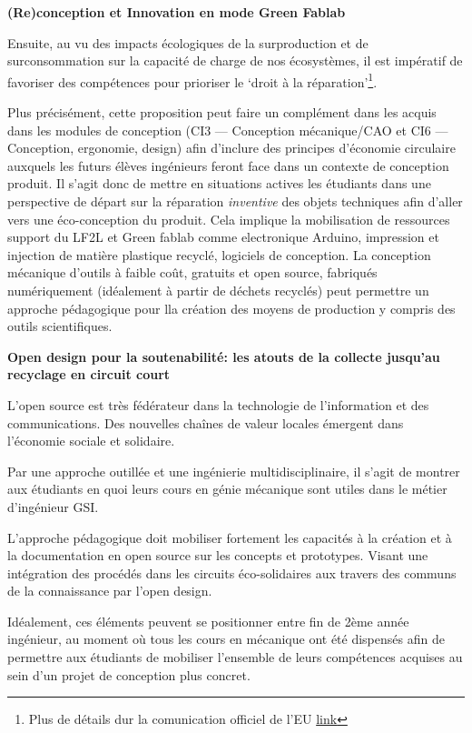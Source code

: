 \documentclass[
  11pt,
]{article}
\begin{document}
\textbf{(Re)conception et Innovation en mode Green Fablab}

Ensuite, au vu des impacts écologiques de la surproduction et de
surconsommation sur la capacité de charge de nos écosystèmes, il est
impératif de favoriser des compétences pour prioriser le `droit à la
réparation'\footnote{Plus de détails dur la comunication officiel de
  l'EU
  \href{https://www.europarl.europa.eu/news/en/headlines/society/20220331STO26410/why-is-the-eu-s-right-to-repair-legislation-important}{link}}.

Plus précisément, cette proposition peut faire un complément dans les
acquis dans les modules de conception (CI3 --- Conception mécanique/CAO
et CI6 --- Conception, ergonomie, design) afin d'inclure des principes
d'économie circulaire auxquels les futurs élèves ingénieurs feront face
dans un contexte de conception produit. Il s'agit donc de mettre en
situations actives les étudiants dans une perspective de départ sur la
réparation \emph{inventive} des objets techniques afin d'aller vers une
éco-conception du produit. Cela implique la mobilisation de ressources
support du LF2L et Green fablab comme electronique Arduino, impression
et injection de matière plastique recyclé, logiciels de conception. La
conception mécanique d'outils à faible coût, gratuits et open source,
fabriqués numériquement (idéalement à partir de déchets recyclés) peut
permettre un approche pédagogique pour lla création des moyens de
production y compris des outils scientifiques.

\textbf{Open design pour la soutenabilité: les atouts de la collecte
jusqu'au recyclage en circuit court}

L'open source est très fédérateur dans la technologie de l'information
et des communications. Des nouvelles chaînes de valeur locales émergent
dans l'économie sociale et solidaire.

Par une approche outillée et une ingénierie multidisciplinaire, il
s'agit de montrer aux étudiants en quoi leurs cours en génie mécanique
sont utiles dans le métier d'ingénieur GSI.

L'approche pédagogique doit mobiliser fortement les capacités à la
création et à la documentation en open source sur les concepts et
prototypes. Visant une intégration des procédés dans les circuits
éco-solidaires aux travers des communs de la connaissance par l'open
design.

Idéalement, ces éléments peuvent se positionner entre fin de 2ème année
ingénieur, au moment où tous les cours en mécanique ont été dispensés
afin de permettre aux étudiants de mobiliser l'ensemble de leurs
compétences acquises au sein d'un projet de conception plus concret.
\end{document}
